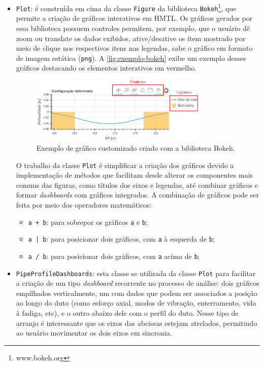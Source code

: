 \begin{itemize}

    \item \texttt{Plot}: é construída em cima da classe \texttt{Figure} da biblioteca \texttt{Bokeh}\footnote{www.bokeh.org}, que permite a criação de gráficos interativos em HMTL. Os gráficos gerados por essa biblioteca possuem controles permitem, por exemplo, que o usuário dê zoom ou translate os dados exibidos, ative/desative os ítem mostrado por meio de clique nos respectivos itens nas legendas, sabe o gráfico em formato de imagem estática (\texttt{png}). A \autoref{fig:exemplo-bokeh} exibe um exemplo desses gráficos destacando os elementos interativos em vermelho.

    \begin{figure}[!ht]
        \centering
        \caption{Exemplo de gráfico customizado criado com a biblioteca Bokeh.}\label{fig:exemplo-bokeh}
        \includegraphics[width=0.8\textwidth]{imagens/exemplo-bokeh}
    \end{figure}

    O trabalho da classe \texttt{Plot} é simplificar a criação dos gráficos devido a implementação de métodos que facilitam desde alterar os componentes mais comuns das figuras, como títulos dos eixos e legendas, até combinar gráficos e formar \textit{dashboards} com gráficos integrados. A combinação de gráficos pode ser feita por meio dos operadores matemáticos:
    \begin{itemize}
        \item \texttt{a + b}: para sobrepor os gráficos \texttt{a} e \texttt{b};
        \item \texttt{a | b}: para posicionar dois gráficos, com \texttt{a} à esquerda de \texttt{b};
        \item \texttt{a / b}: para posicionar dois gráficos, com \texttt{a} acima de \texttt{b};
    \end{itemize}

    \item \texttt{PipeProfileDashboards}: esta classe se utilizada da classe \texttt{Plot} para facilitar a criação de um tipo \textit{dashboard} recorrente no processo de análise: dois gráficos empilhados verticalmente, um com dados que podem ser associados a posição ao longo do duto (como esforço axial, modos de vibração, enterramento, vida à fadiga, etc), e o outro abaixo dele com o perfil do duto. Nesse tipo de arranjo é interessante que os eixos das abcissas estejam atrelados, permitindo ao usuário movimentar os dois eixos em sincronia.
\end{itemize}

